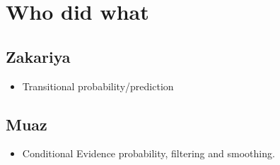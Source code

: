 \documentclass[11pt]{article}
\begin{document}
\section*{Who did what}
\label{sec:orgec9bcae}
\subsection*{Zakariya}
\label{sec:orge438cd5}
\begin{itemize}
\item Transitional probability/prediction
\end{itemize}
\subsection*{Muaz}
\label{sec:org694c30e}
\begin{itemize}
\item Conditional Evidence probability, filtering and smoothing.
\end{itemize}
\end{document}
